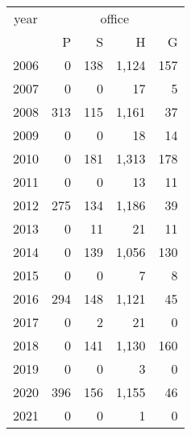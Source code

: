 \footnotesize\begin{tabular}[t]{lrrrr}
\toprule
\multicolumn{1}{c}{year} & \multicolumn{4}{c}{office} \\
\cmidrule(l{3pt}r{3pt}){1-1} \cmidrule(l{3pt}r{3pt}){2-5}
  & P & S & H & G\\
\midrule
2006 & 0 & 138 & 1,124 & 157\\
2007 & 0 & 0 & 17 & 5\\
2008 & 313 & 115 & 1,161 & 37\\
2009 & 0 & 0 & 18 & 14\\
2010 & 0 & 181 & 1,313 & 178\\
2011 & 0 & 0 & 13 & 11\\
2012 & 275 & 134 & 1,186 & 39\\
2013 & 0 & 11 & 21 & 11\\
2014 & 0 & 139 & 1,056 & 130\\
2015 & 0 & 0 & 7 & 8\\
2016 & 294 & 148 & 1,121 & 45\\
2017 & 0 & 2 & 21 & 0\\
2018 & 0 & 141 & 1,130 & 160\\
2019 & 0 & 0 & 3 & 0\\
2020 & 396 & 156 & 1,155 & 46\\
2021 & 0 & 0 & 1 & 0\\
\bottomrule
\end{tabular}
